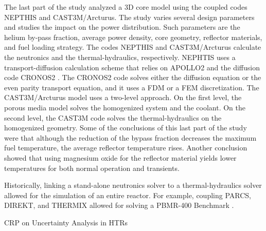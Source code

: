\documentclass[11pt,letterpaper]{article}
\begin{document}
The last part of the study analyzed a 3D core model using the coupled codes NEPTHIS \cite{cavalier_presentation_2005} and CAST3M/Arcturus.
The study varies several design parameters and studies the impact on the power distribution.
Such parameters are the helium by-pass fraction, average power density, core geometry, reflector materials, and fuel loading strategy.
The codes NEPTHIS and CAST3M/Arcturus calculate the neutronics and the thermal-hydraulics, respectively.
NEPHTIS uses a transport-diffusion calculation scheme that relies on APOLLO2 and the diffusion code CRONOS2 \cite{lautard_cronos_1990}.
The CRONOS2 code solves either the diffusion equation or the even parity transport equation, and it uses a \gls{FDM} or a \gls{FEM} discretization.
The CAST3M/Arcturus model uses a two-level approach.
On the first level, the porous media model solves the homogenized system and the coolant.
On the second level, the CAST3M code solves the thermal-hydraulics on the homogenized geometry.
Some of the conclusions of this last part of the study were that although the reduction of the bypass fraction decreases the maximum fuel temperature, the average reflector temperature rises.
Another conclusion showed that using magnesium oxide for the reflector material yields lower temperatures for both normal operation and transients.












Historically, linking a stand-alone neutronics solver to a thermal-hydraulics solver allowed for the simulation of an entire reactor.
For example, coupling PARCS, DIREKT, and THERMIX \cite{seker_analysis_2006} allowed for solving a \gls{PBMR}-400 Benchmark \cite{reitsma_oecdneansc_2006}.

CRP on Uncertainty Analysis in HTRs %
\cite{gougar_htgr_2016}

\pagebreak


\end{document}

